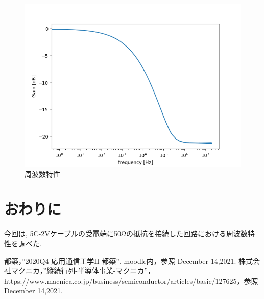 \documentclass[a4j,12pt,]{jarticle}
\begin{document}
\begin{figure}[H]
  \begin{center}
    \includegraphics[width=140mm]{frequency_response.png}
    \caption{周波数特性}
    \label{p3}
  \end{center}
\end{figure}

\section{おわりに}

今回は, 5C-2Vケーブルの受電端に50Ωの抵抗を接続した回路における周波数特性を調べた.

\begin{thebibliography}{5}
  都築，”2020Q4-応用通信工学II-都築”, moodle内，参照 December 14,2021.
  株式会社マクニカ，”縦続行列-半導体事業-マクニカ”，https://www.macnica.co.jp/business/semiconductor/articles/basic/127625，参照 December 14,2021.
\end{thebibliography}
\end{document}
